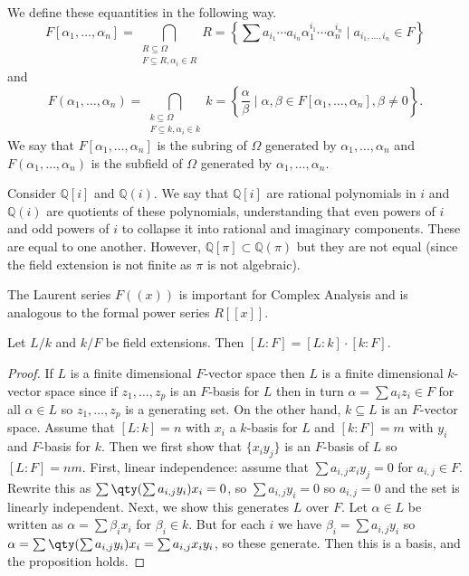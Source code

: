 We define these equantities in the following way. 
\[ F[\alpha_1, \dotsc, \alpha_n] = \bigcap_{\substack{R \subseteq \Omega \\ F \subseteq R, \alpha_i \in R}} R = \left\{\sum a_{i_1} \cdots a_{i_n}\alpha_1^{i_1} \cdots \alpha_n^{i_n} \mid a_{i_1,\dotsc,i_n} \in F\right\} \]
and 
\[ 
	F(\alpha_1, \dotsc, \alpha_n) = \bigcap_{\substack{k \subseteq \Omega \\ F \subseteq k, \alpha_i \in k}} k = 
	\left\{
		\frac{\alpha}{\beta} \mid \alpha,\beta \in F[\alpha_1, \dotsc, \alpha_n], \beta \not= 0
	\right\}.
\]
We say that $F[\alpha_1, \dotsc, \alpha_n]$ is the subring of $\Omega$ generated by $\alpha_1, \dotsc, \alpha_n$ and $F(\alpha_1, \dotsc, \alpha_n)$ is the subfield of $\Omega$ generated by $\alpha_1, \dotsc, \alpha_n$.

\begin{example}
Consider $\mathbb{Q}[i]$ and $\mathbb{Q}(i)$. We say that $\mathbb{Q}[i]$ are rational polynomials in $i$ and $\mathbb{Q}(i)$ are quotients of these polynomials, understanding that even powers of $i$ and odd powers of $i$ to collapse it into rational and imaginary components. These are equal to one another. However, $\mathbb{Q}[\pi] \subset \mathbb{Q}(\pi)$ but they are not equal (since the field extension is not finite as $\pi$ is not algebraic).
\end{example}

The Laurent series $F((x))$ is important for Complex Analysis and is analogous to the formal power series $R[[x]]$.

\begin{theorem}
Let $L/k$ and $k/F$ be field extensions. Then $[L : F] = [L : k] \cdot [k : F]$.
\end{theorem}

\begin{proof}
If $L$ is a finite dimensional $F$-vector space then $L$ is a finite dimensional $k$-vector space since if $z_1,\dotsc,z_p$ is an $F$-basis for $L$ then in turn $\alpha = \sum a_iz_i \in F $ for all $\alpha \in L$ so $z_1,\dotsc,z_p$ is a generating set. On the other hand, $k \subseteq L$ is an $F$-vector space. Assume that $[L : k] = n$ with $x_i$ a $k$-basis for $L$ and $[k : F] = m$ with $y_i$ and $F$-basis for $k$. Then we first show that $\{x_iy_j\}$ is an $F$-basis of $L$ so $[L:F] = nm$. First, linear independence: assume that $\sum a_{i,j}x_iy_j = 0$ for $a_{i,j} \in F$. Rewrite this as $\sum\qty(\sum a_{i,j}y_i)x_i = 0$, so $\sum a_{i,j}y_i = 0$ so $a_{i,j} = 0$ and the set is linearly independent. Next, we show this generates $L$ over $F$. Let $\alpha \in L$ be written as $\alpha = \sum \beta_ix_i$ for $\beta_i \in k$. But for each $i$ we have $\beta_i = \sum a_{i,j}y_i$ so $\alpha = \sum\qty(\sum a_{i,j}y_i)x_i = \sum a_{i,j}x_iy_i$, so these generate. Then this is a basis, and the proposition holds.
\end{proof}